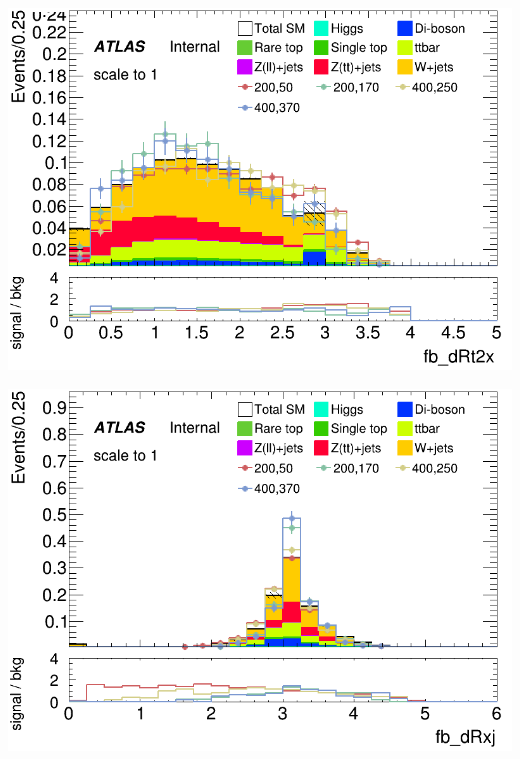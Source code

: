 \documentclass[usenames,dvipsnames]{beamer}
\begin{document}
\begin{frame}
    \begin{minipage}{0.32\textwidth}
        \centering
        \includegraphics[width=\textwidth]{graphics/LH_met_sig/LH_fb_dRt2x_norm.png}
    \end{minipage}
    \hfill
    \begin{minipage}{0.32\textwidth}
        \centering
        \includegraphics[width=\textwidth]{graphics/LH_met_sig/LH_fb_dRxj_norm.png}
    \end{minipage}
    \hfill
    \begin{minipage}{0.32\textwidth}
        \centering
        \setlength{\fboxsep}{0pt} %
        \setlength{\fboxrule}{1pt} %

\end{minipage}
\end{frame}
\end{document}
